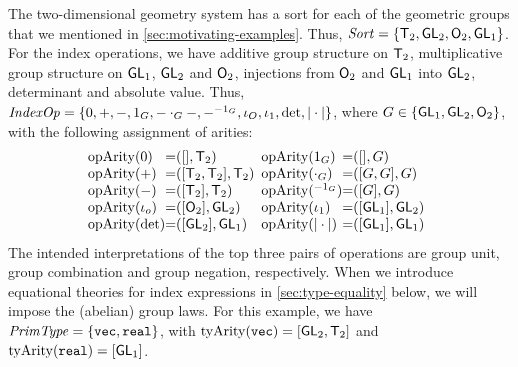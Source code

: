 \begin{example}
  The two-dimensional geometry system has a sort for each of the
  geometric groups that we mentioned in
  \autoref{sec:motivating-examples}. Thus, $\mathit{Sort} = \{\mathsf{T}_2,
  \mathsf{GL}_2, \mathsf{O}_2, \mathsf{GL}_1 \}$. For the index operations, we
  have additive group structure on $\mathsf{T}_2$, multiplicative
  group structure on $\mathsf{GL}_1$, $\mathsf{GL}_2$ and $\mathsf{O}_2$,
  injections from $\mathsf{O}_2$ and $\mathsf{GL}_1$ into $\mathsf{GL}_2$,
  determinant and absolute value. Thus, $\mathit{IndexOp} = \{ 0, +, -,
  1_G, -\cdot_G-, -^{-1_G}, \iota_O, \iota_1, \det, |\cdot| \}$, where
  $G \in \{\mathsf{GL}_1, \mathsf{GL}_2, \mathsf{O}_2\}$, with the following
  assignment of arities:
  \begin{displaymath}
    \begin{array}{@{}l@{\hspace{0em}=\hspace{0em}}l@{\hspace{0.5em}}l@{\hspace{0em}=\hspace{0em}}l}
      \indexOpArity(0) & ([], \SynTransl{2}) &
      \indexOpArity(1_G) & ([], G) \\
      \indexOpArity(+) & ([\SynTransl{2}, \SynTransl{2}], \SynTransl{2}) &
      \indexOpArity(\cdot_G) & ([G,G],G) \\
      \indexOpArity(-) & ([\SynTransl{2}], \SynTransl{2}) &
      \indexOpArity(^{-1_G}) & ([G], G) \\
      \indexOpArity(\iota_o) & ([\SynOrth{2}], \SynGL{2}) &
      \indexOpArity(\iota_1) & ([\SynGL{1}], \SynGL{2}) \\
      \indexOpArity(\det) & ([\SynGL{2}], \SynGL{1}) &
      \indexOpArity(|\cdot|) & ([\SynGL{1}], \SynGL{1})
    \end{array}
  \end{displaymath}
  The intended interpretations of the top three pairs of operations
  are group unit, group combination and group negation,
  respectively. When we introduce equational theories for index
  expressions in \autoref{sec:type-equality} below, we will impose the
  (abelian) group laws. For this example, we have $\mathit{PrimType} = \{
  \texttt{vec}, \texttt{real} \}$, with
  $\mathrm{tyArity}(\texttt{vec}) = [\mathsf{GL}_2, \mathsf{T}_2]$ and
  $\mathrm{tyArity}(\texttt{real}) = [\mathsf{GL}_1]$.
\end{example}


